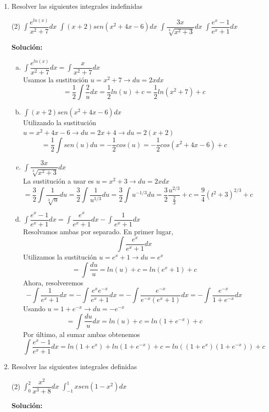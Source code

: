 \documentclass[12pt]{article}
\newenvironment{solucion}
{\begin{mdframed}[backgroundcolor=black!10]
		{\bf Solución:}\\
	}
	{
	\end{mdframed}
}
\newenvironment{preguntas}
{\begin{enumerate}\itemsep12pt
	}
	{
	\end{enumerate}
}
\newcommand{\ra}{\rightarrow}
\begin{document}
\begin{preguntas}
\item Resolver las siguientes integrales indefinidas
\begin{tasks}(2)
\task $\displaystyle\int \dfrac{e^{ln(x)}}{x^2+7}dx$
\task $\displaystyle\int (x+2)sen(x^2+4x-6)dx$
\task $\displaystyle\int \dfrac{3x}{\sqrt[3]{x^2+3}}dx$
\task $\displaystyle\int \dfrac{e^x-1}{e^x+1}dx$
\end{tasks}
\begin{solucion}

\begin{enumerate}[a)]
\item $\displaystyle\int \dfrac{e^{ln(x)}}{x^2+7}dx = \displaystyle\int \dfrac{x}{x^2+7}dx$\\
			Usamos la sustitución $u = x^2+7 \ra du = 2xdx$
			$$= \dfrac{1}{2} \displaystyle\int \dfrac{2}{u}dx = \dfrac{1}{2} ln(u) + c = \dfrac{1}{2}ln(x^2+7) + c$$
\item $\displaystyle\int (x+2)sen(x^2+4x-6)dx$\\
			Utilizando la sustitución $u = x^2+4x-6 \ra du = 2x + 4 \ra du = 2(x+2)$
			$$=\dfrac{1}{2}\displaystyle\int sen(u)du = -\dfrac{1}{2}cos(u) = -\dfrac{1}{2}cos(x^2+4x-6)+c$$
\item $\displaystyle\int \dfrac{3x}{\sqrt[3]{x^2+3}}dx$\\
			La sustitución a usar es $u=x^2+3 \ra du=2xdx$
			$$= \dfrac{3}{2} \displaystyle\int \dfrac{1}{\sqrt[3]{u}}du = \dfrac{3}{2} \displaystyle\int \dfrac{1}{u^{1/3}}du = \dfrac{3}{2} \displaystyle\int u^{-1/3}du = \dfrac{3}{2}\dfrac{u^{2/3}}{\frac{2}{3}} + c = \dfrac{9}{4}(t^2+3)^{2/3}+c$$
\item $\displaystyle\int \dfrac{e^x-1}{e^x+1}dx = \displaystyle\int \dfrac{e^x}{e^x+1}dx - \displaystyle\int \dfrac{1}{e^x+1}dx$\\
			Resolvamos ambas por separado. En primer lugar,
			$$ \displaystyle\int \dfrac{e^x}{e^x+1}dx$$
			Utilizamos la sustitución $u=e^x+1 \ra du=e^x$
			$$= \displaystyle\int \dfrac{du}{u} = ln(u) + c = ln(e^x+1)+c$$
			Ahora, resolveremos
			$$-\displaystyle\int \dfrac{1}{e^x+1}dx = -\displaystyle\int \dfrac{e^xe^{-x}}{e^x+1}dx= -\displaystyle\int \dfrac{e^{-x}}{e^{-x}(e^x+1)}dx = -\displaystyle\int \dfrac{e^{-x}}{1+e^{-x}}dx$$
			Usando $u=1+e^{-x} \ra du = -e^{-x}$
			$$= \displaystyle\int \dfrac{du}{u}dx = ln(u) +c = ln(1+e^{-x})+c$$
			Por último, al sumar ambas obtenemos
			$$\displaystyle\int \dfrac{e^x-1}{e^x+1}dx = ln(1+e^x) + ln(1+e^{-x}) + c = ln((1+e^x)(1+e^{-x}))+c$$
\end{enumerate}
\end{solucion}
\item Resolver las siguientes integrales definidas
\begin{tasks}(2)
\task $\displaystyle\int_0^2 \dfrac{x^2}{x^3+8} dx$
\task $\displaystyle\int_{-1}^1 xsen(1-x^2)dx$
\end{tasks}
\begin{solucion}


\end{solucion}
\end{preguntas}
\end{document}

